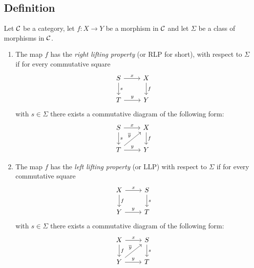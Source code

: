     \subsection{Definition}
        Let $\mathcal{C}$ be a category, let $f \colon X \to Y$ be a morphism in $\mathcal{C}$ and let $\Sigma$ be a class of morphisms in $\mathcal{C}$.
        \begin{enumerate}[label=\roman*)]
            \item 
                The map $f$ has the \emph{right lifting property} (or RLP for short), with respect to $\Sigma$ if for every commutative square
                \begin{equation*}
                    \begin{tikzcd}
                        S \arrow[r, "x"] \arrow[d, "s"] & X \arrow[d, "f"] \\
                        T \arrow[r, "y"] & Y
                    \end{tikzcd}
                \end{equation*}
                with $s \in \Sigma$ there exists a commutative diagram of the following form:
                \begin{equation*}
                    \begin{tikzcd}
                        S \arrow[r, "x"] \arrow[d, "s"] & X \arrow[d, "f"] \\
                        T \arrow[r, "y"] \arrow[ur, "\overline{y}"]& Y
                    \end{tikzcd}
                \end{equation*}
            \item 
                The map $f$ has the \emph{left lifting property} (or LLP) with respect to $\Sigma$ if for every commutative square 
                \begin{equation*}
                    \begin{tikzcd}
                        X \arrow[r, "x"] \arrow[d, "f"] & S \arrow[d, "s"] \\
                        Y \arrow[r, "y"] & T
                    \end{tikzcd}
                \end{equation*}
                with $s \in \Sigma$ there exists a commutative diagram of the following form:
                \begin{equation*}
                    \begin{tikzcd}
                        X \arrow[r, "x"] \arrow[d, "f"] & S \arrow[d, "s"] \\
                        Y \arrow[r, "y"] \arrow[ur, "\overline{y}"]& T
                    \end{tikzcd}
                \end{equation*}
        \end{enumerate}

